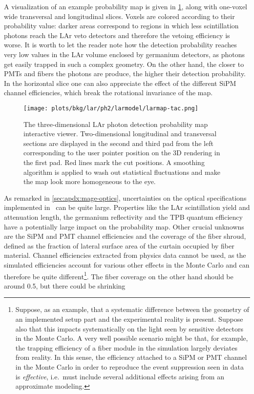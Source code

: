 A visualization of an example probability map is given in
\cref{fig:bkg:lar:ph2:larmap:tac}, along with one-voxel wide transversal and longitudinal
slices. Voxels are colored according to their probability value: darker areas correspond
to regions in which less scintillation photons reach the LAr veto detectors and therefore
the vetoing efficiency is worse. It is worth to let the reader note how the detection
probability reaches very low values in the LAr volume enclosed by germanium detectors, as
photons get easily trapped in such a complex geometry. On the other hand, the closer to
PMTs and fibers the photons are produce, the higher their detection probability. In the
horizontal slice one can also appreciate the effect of the different SiPM channel
efficiencies, which break the rotational invariance of the map.
\newpar
\begin{figure}
  \centering
  \texttt{[image: plots/bkg/lar/ph2/larmodel/larmap-tac.png]}
  \caption{%
    The three-dimensional LAr photon detection probability map interactive viewer.
    Two-dimensional longitudinal and transversal sections are displayed in the second and
    third pad from the left corresponding to the user pointer position on the 3D
    rendering in the first pad. Red lines mark the cut positions. A smoothing algorithm is
    applied to wash out statistical fluctuations and make the map look more homogeneous to
    the eye.
  }\label{fig:bkg:lar:ph2:larmap:tac}
\end{figure}
As remarked in \cref{sec:apdx:mage-optics}, uncertainties on the optical specifications
implemented in \mage\ can be quite large. Properties like the LAr scintillation yield and
attenuation length, the germanium reflectivity and the TPB quantum efficiency have a
potentially large impact on the probability map. Other crucial unknowns are the SiPM and PMT
channel efficiencies and the coverage of the fiber shroud, defined as the fraction of
lateral surface area of the curtain occupied by fiber material. Channel efficiencies
extracted from physics data cannot be used, as the simulated efficiencies account for
various other effects in the Monte Carlo and can therefore be quite
different\footnote{\label{footnote:bkg:lar:ph2:mc-eff}%
  Suppose, as an example, that a systematic difference between the geometry of an
  implemented setup part and the experimental reality is present. Suppose also that this
  impacts systematically on the light seen by sensitive detectors in the Monte Carlo. A
  very well possible scenario might be that, for example, the trapping efficiency of a
  fiber module in the simulation largely deviates from reality. In this sense, the
  efficiency attached to a SiPM or PMT channel in the Monte Carlo in order to reproduce
  the event suppression seen in data is \emph{effective}, i.e.~must include several
  additional effects arising from an approximate modeling.
}. The fiber coverage on the other hand should be around 0.5, but there could be shrinking
